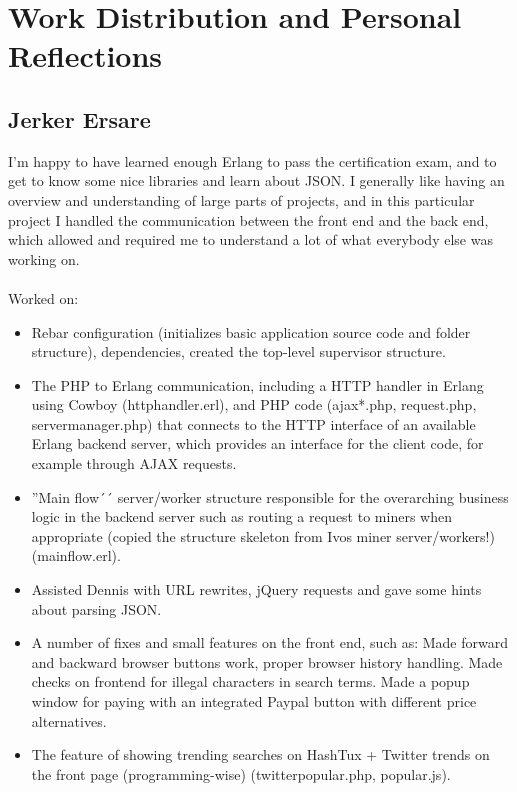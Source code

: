 \chapter{Work Distribution and Personal Reflections}
\section{Jerker Ersare}
I'm happy to have learned enough Erlang to pass the certification exam, and to
get to know some nice libraries and learn about JSON. I generally like having an
overview and understanding of large parts of projects, and in this particular
project I handled the communication between the front end and the back end,
which allowed and required me to understand a lot of what everybody else was
working on. \\ \\
Worked on:
\begin{itemize}
  \item Rebar configuration (initializes basic application source code and
        folder structure), dependencies, created the top-level supervisor
        structure.
  \item The PHP to Erlang communication, including a HTTP handler in Erlang
        using Cowboy (http\textunderscore handler.erl), and PHP code (ajax*.php,
        request.php, server\textunderscore manager.php) that connects to the
        HTTP interface of an available Erlang backend server, which provides an
        interface for the client code, for example through AJAX requests.
  \item ''Main flow´´ server/worker structure responsible for the overarching
        business logic in the backend server such as routing a request to miners
        when appropriate (copied the structure skeleton from Ivos miner
        server/workers!) (main\textunderscore flow\textunderscore *.erl).
  \item Assisted Dennis with URL rewrites, jQuery requests and gave some hints
        about parsing JSON.
  \item A number of fixes and small features on the front end, such as: Made
        forward and backward browser buttons work, proper browser history
        handling. Made checks on frontend for illegal characters in search
        terms. Made a popup window for paying with an integrated Paypal button
        with different price alternatives.
  \item The feature of showing trending searches on HashTux + Twitter trends on
        the front page (programming-wise) (twitter\textunderscore popular.php,
        popular.js).
\end{itemize}
\newpage


